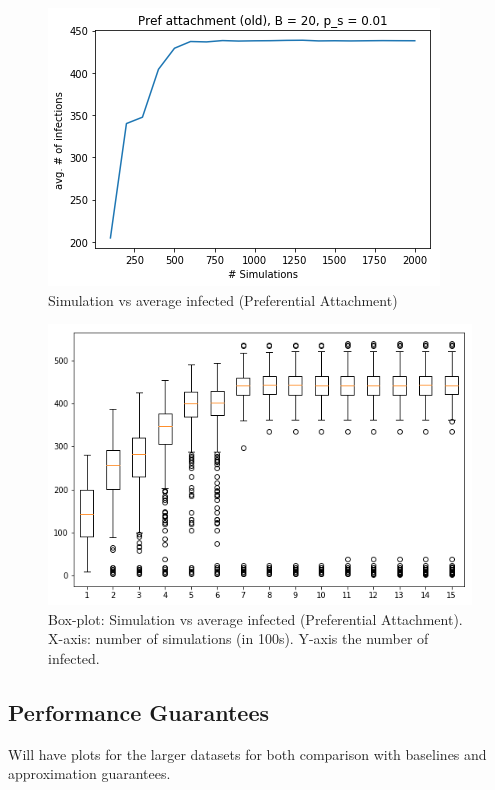 \begin{figure}[!h]
    \centering
    \includegraphics[scale = 0.6]{Figuresnew/simulations.png}
    \caption{Simulation vs average infected (Preferential Attachment)}
    \label{fig:pa_simvsavg}
\end{figure}
 
\begin{figure}[!h]
    \centering
    \includegraphics[scale = 0.4]{Figuresnew/boxplotpa.png}
    \caption{Box-plot: Simulation vs average infected (Preferential Attachment). X-axis: number of simulations (in 100s). Y-axis the number of infected.}
    \label{fig:pa_boxplot}
\end{figure}
\subsection{Performance Guarantees}
Will have plots for the larger datasets for both comparison with baselines and approximation guarantees.
